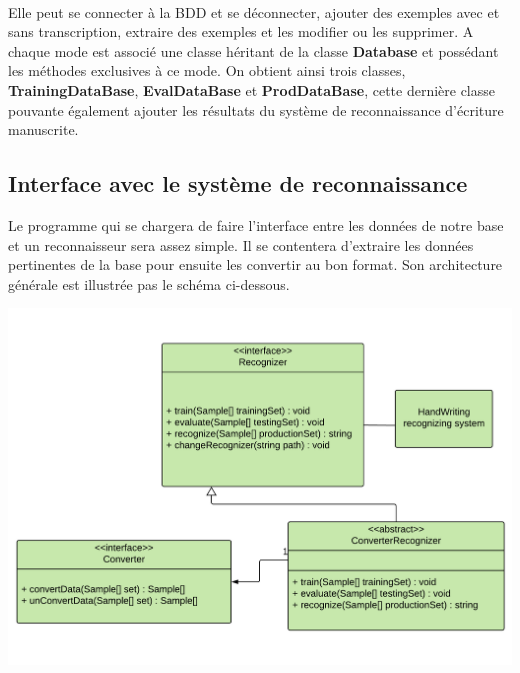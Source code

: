 \paragraph{}

Elle peut se connecter à la BDD et se déconnecter, ajouter des exemples avec
et sans transcription, extraire des exemples et les modifier ou les supprimer.
A chaque mode est associé une classe héritant de la classe \textbf{Database}
et possédant les méthodes exclusives à ce mode. On obtient ainsi trois
classes, \textbf{TrainingDataBase}, \textbf{EvalDataBase} et
\textbf{ProdDataBase}, cette dernière classe pouvante également ajouter les
résultats du système de reconnaissance d'écriture manuscrite.

\subsection{Interface avec le système de reconnaissance}

Le programme qui se chargera de faire l’interface entre les données de notre
base et un reconnaisseur sera assez simple. Il se contentera d’extraire les
données pertinentes de la base pour ensuite les convertir au bon format.
Son architecture générale est illustrée pas le schéma ci-dessous.

\newpage

\begin{mdframed}[frametitle={Figure 9 : Diagramme de classes de l'interface avec le système de reconaissance d'écriture manuscrite}, innerbottommargin=10]
\begin{center}
\includegraphics[scale=0.5]{interface-reconnaisseur.pdf}
\end{center}
\end{mdframed}

